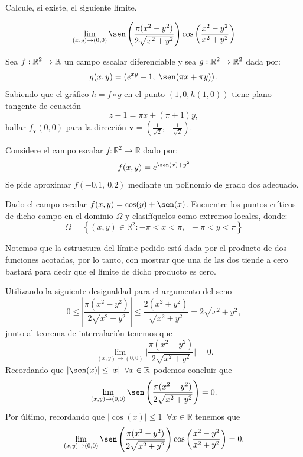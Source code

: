 \begin{question}
    Calcule, si existe, el siguiente l\'imite.

    \[
        \lim_{(x,y)\to(0,0)}\sen\left(\frac{\pi(x^{2}-y^{2})}{2\sqrt{x^{2}+y^{2}}}\right) \cos\left(\frac{x^{2}-y^{2}}{x^{2}+y^{2}}\right)
    \]
\end{question}

\begin{question}
    Sea $f:\mathbb{R}^2\to\mathbb{R}$ un campo escalar diferenciable y sea $g:\mathbb{R}^2\to\mathbb{R}^2$ dada por: $$g(x,y)=\left(e^{xy}-1,\;\sen(\pi x+\pi y)\right).$$   \noindent Sabiendo que el gr\'afico $h=f\circ g$ en el punto $(1,0,h(1,0))$ tiene plano tangente de ecuaci\'on $$z-1=\pi x+(\pi+1) y,$$  hallar $f_{\mathbf{v}}(0,0)$ para la direcci\'on ${\mathbf{v}}=\left(\frac{1}{\sqrt{2}},-\frac{1}{\sqrt{2}}\right)$.
\end{question}

\begin{question}
    Considere el campo escalar $f:\mathbb{R}^{2}\rightarrow\mathbb{R}$ dado por:  $$f(x,y)=e^{\sen(x)+y^{2}}$$
    \noindent Se pide aproximar $f(-0\text{.}1,\:0\text{.}2)$ mediante un polinomio de grado dos adecuado.
\end{question}

\begin{question}
    Dado el campo escalar $\displaystyle f(x,y)=\cos(y)+\sen(x)$. Encuentre los puntos cr\'iticos de dicho campo en el dominio $\Omega$ y clasif\'iquelos como extremos locales, donde:  \[\Omega=\left\{(x,y)\in\mathbb{R}^{2}: -\pi<x<\pi,\;\;-\pi<y<\pi \right\}\]
\end{question}

\newpage

\begin{solution}
    Notemos que la estructura del límite pedido está dada por el producto de dos funciones acotadas, por lo tanto, con mostrar que una de las dos tiende a cero bastar\'a para decir que el límite de dicho producto es cero.

    Utilizando la siguiente desigualdad para el argumento del seno
    \[ 
    0 \leq \left| \frac{\pi(x^{2}-y^{2})}{2\sqrt{x^{2}+y^{2}}} \right| \leq
    \frac{2(x^2+y^2)}{\sqrt{x^2+y^2}} = 2 \sqrt{x^2+y^2},
    \]
    junto al teorema de intercalaci\'on tenemos que
    \[
        \lim_{(x,y)\to(0,0)}\bigg| \frac{\pi(x^{2}-y^{2})}{2\sqrt{x^{2}+y^{2}}}\bigg|=0.
    \]
    Recordando que $|\sen(x)| \leq |x| \; \; \forall x \in \mathbb{R}$ podemos concluir que
    \[
        \lim_{(x,y)\to(0,0)}\sen\left(\frac{\pi(x^{2}-y^{2})}{2\sqrt{x^{2}+y^{2}}}\right)=0.
    \]
    Por \'ultimo, recordando que $|\cos(x)| \leq 1 \; \; \forall x \in \mathbb{R}$  tenemos que
    \[
        \lim_{(x,y)\to(0,0)}\sen\left(\frac{\pi(x^{2}-y^{2})}{2\sqrt{x^{2}+y^{2}}}\right) \cos\left(\frac{x^{2}-y^{2}}{x^{2}+y^{2}}    \right)=0.
    \]
\end{solution}


